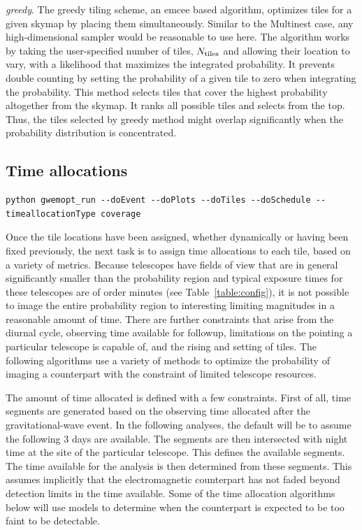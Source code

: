 \documentclass[twocolumn]{aastex62}
\begin{document}
\emph{greedy}. The greedy tiling scheme, an emcee \citep{FoHo2013} based algorithm, optimizes tiles for a given skymap by placing them simultaneously. Similar to the Multinest case, any high-dimensional sampler would be reasonable to use here. The algorithm works by taking the user-specified number of tiles, $N_{\rm tiles}$ and allowing their location to vary, with a likelihood that maximizes the integrated probability. It prevents double counting by setting the probability of a given tile to zero when integrating the probability. This method selects tiles that cover the highest probability altogether from the skymap. It ranks all possible tiles and selects from the top. Thus, the tiles selected by greedy method might overlap significantly when the probability distribution is concentrated. 

\subsection{Time allocations}
\label{subsection:timeallocation}
\begin{lstlisting}
python gwemopt_run --doEvent --doPlots --doTiles --doSchedule --timeallocationType coverage
\end{lstlisting}
Once the tile locations have been assigned, whether dynamically or having been fixed previously, the next task is to assign time allocations to each tile, based on a variety of metrics. 
Because telescopes have fields of view that are in general significantly smaller than the probability region and typical exposure times for these telescopes are of order minutes (see Table~\ref{table:config}), it is not possible to image the entire probability region to interesting limiting magnitudes in a reasonable amount of time.
There are further constraints that arise from the diurnal cycle, observing time available for followup, limitations on the pointing a particular telescope is capable of, and the rising and setting of tiles.
The following algorithms use a variety of methods to optimize the probability of imaging a counterpart with the constraint of limited telescope resources.

The amount of time allocated is defined with a few constraints. 
First of all, time segments are generated based on the observing time allocated after the gravitational-wave event. 
In the following analyses, the default will be to assume the following 3 days are available.
The segments are then intersected with night time at the site of the particular telescope.
This defines the available segments. 
The time available for the analysis is then determined from these segments.
This assumes implicitly that the electromagnetic counterpart has not faded beyond detection limits in the time available. Some of the time allocation algorithms below will use models to determine when the counterpart is expected to be too faint to be detectable.
\end{document}

